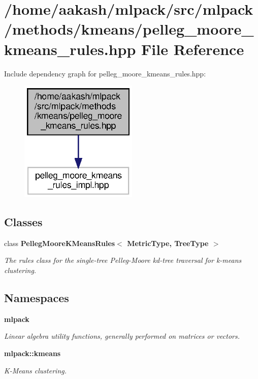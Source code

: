 \section{/home/aakash/mlpack/src/mlpack/methods/kmeans/pelleg\+\_\+moore\+\_\+kmeans\+\_\+rules.hpp File Reference}
\label{pelleg__moore__kmeans__rules_8hpp}
Include dependency graph for pelleg\+\_\+moore\+\_\+kmeans\+\_\+rules.\+hpp\+:
\nopagebreak
\begin{figure}[H]
\begin{center}
\leavevmode
\includegraphics[width=159pt]{pelleg__moore__kmeans__rules_8hpp__incl}
\end{center}
\end{figure}
\subsection*{Classes}
\begin{DoxyCompactItemize}
\item 
class \textbf{ Pelleg\+Moore\+K\+Means\+Rules$<$ Metric\+Type, Tree\+Type $>$}
\begin{DoxyCompactList}\small\item\em The rules class for the single-\/tree Pelleg-\/\+Moore kd-\/tree traversal for k-\/means clustering. \end{DoxyCompactList}\end{DoxyCompactItemize}
\subsection*{Namespaces}
\begin{DoxyCompactItemize}
\item 
 \textbf{ mlpack}
\begin{DoxyCompactList}\small\item\em Linear algebra utility functions, generally performed on matrices or vectors. \end{DoxyCompactList}\item 
 \textbf{ mlpack\+::kmeans}
\begin{DoxyCompactList}\small\item\em K-\/\+Means clustering. \end{DoxyCompactList}\end{DoxyCompactItemize}


